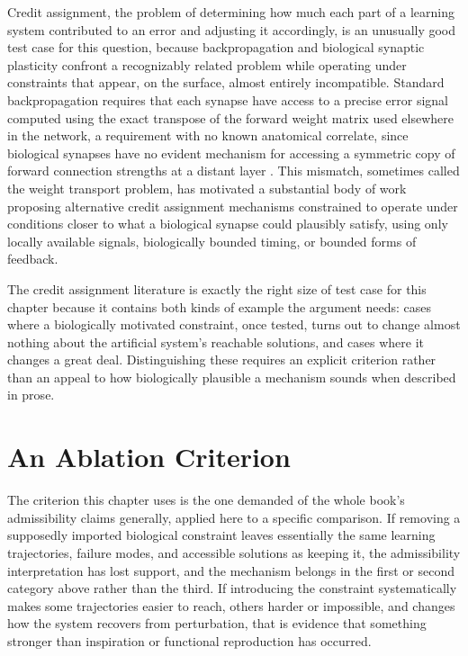 \documentclass[11pt]{book}
\begin{document}
Credit assignment, the problem of determining how much each part of a learning system contributed to an error and adjusting it accordingly, is an unusually good test case for this question, because backpropagation and biological synaptic plasticity confront a recognizably related problem while operating under constraints that appear, on the surface, almost entirely incompatible. Standard backpropagation requires that each synapse have access to a precise error signal computed using the exact transpose of the forward weight matrix used elsewhere in the network, a requirement with no known anatomical correlate, since biological synapses have no evident mechanism for accessing a symmetric copy of forward connection strengths at a distant layer \cite{crick1989}. This mismatch, sometimes called the weight transport problem, has motivated a substantial body of work proposing alternative credit assignment mechanisms constrained to operate under conditions closer to what a biological synapse could plausibly satisfy, using only locally available signals, biologically bounded timing, or bounded forms of feedback.

The credit assignment literature is exactly the right size of test case for this chapter because it contains both kinds of example the argument needs: cases where a biologically motivated constraint, once tested, turns out to change almost nothing about the artificial system's reachable solutions, and cases where it changes a great deal. Distinguishing these requires an explicit criterion rather than an appeal to how biologically plausible a mechanism sounds when described in prose.

\section{An Ablation Criterion}

The criterion this chapter uses is the one demanded of the whole book's admissibility claims generally, applied here to a specific comparison. If removing a supposedly imported biological constraint leaves essentially the same learning trajectories, failure modes, and accessible solutions as keeping it, the admissibility interpretation has lost support, and the mechanism belongs in the first or second category above rather than the third. If introducing the constraint systematically makes some trajectories easier to reach, others harder or impossible, and changes how the system recovers from perturbation, that is evidence that something stronger than inspiration or functional reproduction has occurred.
\end{document}
